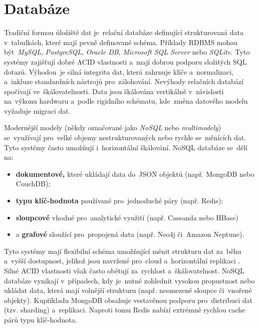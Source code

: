 \section{Databáze}
\label{sec:research-db}

Tradiční formou úložiště dat je~relační databáze definující strukturovaná
data v~tabulkách, které mají pevně definované schéma. Příklady RDBMS mohou
být~\emph{MySQL}, \emph{PostgreSQL}, \emph{Oracle DB}, \emph{Microsoft
SQL Server} nebo \emph{SQLite}. Tyto systémy zajišťují dobré ACID vlastnosti
a~mají dobrou podporu složitých SQL dotazů. Výhodou~je silná integrita dat,
která zahrnuje klíče a~normalizaci, a~inkluze standardních nástrojů
pro~zálohování. Nevýhody relačních databází spočívají ve~škálovatelnosti.
Data jsou škálována vertikálně v~závislosti na~výkonu hardwaru a~podle
rigidního schématu, kde~změna datového modelu vyžaduje migraci dat.
\cite{YHVfLHsNlUItkF6G,Fny73hg0lVaoqYAl} %

Modernější modely (někdy označované jako \emph{NoSQL} nebo
\emph{multimodely}) se~využívají pro~velké objemy nestrukturovaných nebo
rychle se~měnících dat. Tyto systémy často umožňují i~horizontální
škálování. NoSQL databáze se~dělí na:

\begin{itemize}
    \item \textbf{dokumentové,} které ukládají data do~JSON objektů
        (např. MongoDB nebo CouchDB);
    \item \textbf{typu klíč-hodnota} používané pro~jednoduché páry
        (např. Redis);
    \item \textbf{sloupcové} vhodné pro~analytické využití
        (např. Cassanda nebo HBase)
    \item a \textbf{grafové} sloužící pro~propojená data
        (např. Neo4j či~Amazon Neptune).
\end{itemize}

Tyto systémy mají flexibilní schéma umožňující měnit strukturu dat
za~běhu a~vyšší dostupnost, jelikož jsou navržené pro~cloud a~horizontální
replikaci \cite{YHVfLHsNlUItkF6G,Fny73hg0lVaoqYAl}. %
Silné ACID vlastnosti však často obětují za~rychlost a~škálovatelnost.
NoSQL databáze vynikají v~případech, kdy je~nutné zohlednit vysokou
propustnost nebo ukládat data, která mají volnější strukturu
(např. neomezené sloupce či~vnořené objekty). Kupříkladu MongoDB obsahuje
vestavěnou podporu pro~distribuci dat (tzv. sharding) a~replikaci.
Naproti tomu Redis nabízí extrémně rychlou cache párů typu klíč-hodnota.

